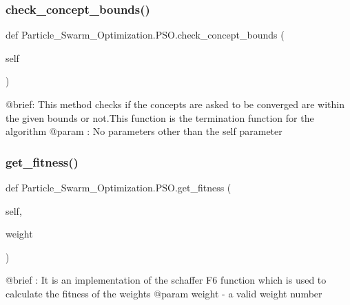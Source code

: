 \subsubsection{\texorpdfstring{check\+\_\+concept\+\_\+bounds()}{check\_concept\_bounds()}}
{\footnotesize\ttfamily def Particle\+\_\+\+Swarm\+\_\+\+Optimization.\+P\+S\+O.\+check\+\_\+concept\+\_\+bounds (\begin{DoxyParamCaption}\item[{}]{self }\end{DoxyParamCaption})}

\begin{DoxyVerb}@brief: This method checks if the concepts are asked to be converged are within the given bounds or not.This function is the
    termination function for the algorithm
@param  : No parameters other than the self parameter
\end{DoxyVerb}
 \hypertarget{class_particle___swarm___optimization_1_1_p_s_o_aadc88450078ac4c483d890a87dee9b0e}{}\label{class_particle___swarm___optimization_1_1_p_s_o_aadc88450078ac4c483d890a87dee9b0e} 
\subsubsection{\texorpdfstring{get\+\_\+fitness()}{get\_fitness()}}
{\footnotesize\ttfamily def Particle\+\_\+\+Swarm\+\_\+\+Optimization.\+P\+S\+O.\+get\+\_\+fitness (\begin{DoxyParamCaption}\item[{}]{self,  }\item[{}]{weight }\end{DoxyParamCaption})}

\begin{DoxyVerb}@brief : It is an implementation of the schaffer F6 function which is used to calculate the fitness of the weights
@param weight - a valid weight number\end{DoxyVerb}
 \hypertarget{class_particle___swarm___optimization_1_1_p_s_o_aba0d1ce14ce74445ee798358d5475559}{}\label{class_particle___swarm___optimization_1_1_p_s_o_aba0d1ce14ce74445ee798358d5475559} 
